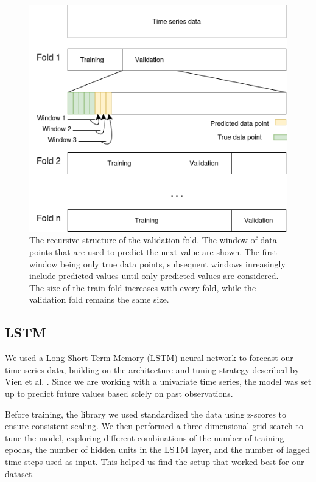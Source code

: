 \documentclass[conference]{IEEEtran}
\begin{document}
\begin{figure}
    \includegraphics[scale = 0.47]{pictures/recursivecv.drawio.png}
    \caption{The recursive structure of the validation fold. The window of data points that are used 
    to predict the next value are shown. The first window being only true data points, subsequent windows
    inreasingly include predicted values until only predicted values are considered. The size of the 
    train fold increases with every fold, while the validation fold remains the same size.}
    \label{fig:recursivecv}
\end{figure}



\subsection{LSTM}
We used a Long Short-Term Memory (LSTM) neural network to forecast our time series data, building on 
the architecture and tuning strategy described by Vien et al. \cite{kuen2021machine}. Since we are working 
with a univariate time series, the model was set up to predict future values based solely on past 
observations.

Before training, the library we used standardized the data using z-scores to ensure consistent scaling. We 
then performed a three-dimensional grid search to tune the model, exploring different combinations of the 
number of training epochs, the number of hidden units in the LSTM layer, and the number of lagged time 
steps used as input. This helped us find the setup that worked best for our dataset.
\end{document}
